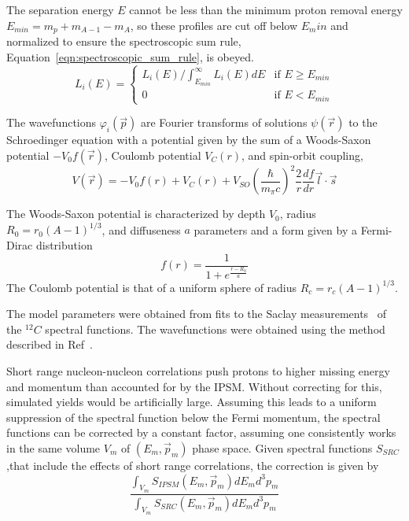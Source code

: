 The separation energy $E$ cannot be less than the minimum proton removal
energy $E_{min}=m_p + m_{A-1} - m_A$, so these profiles are cut off below
$E_min$ and normalized to ensure the spectroscopic sum rule,
Equation~\ref{eqn:spectroscopic_sum_rule}, is obeyed.
\begin{equation}
    L_i(E) =
    \begin{cases}
        L_i(E) / \int^{\infty}_{E_{min}} L_i(E) dE & \text{if $E \geq E_{min}$} \\
        0 & \text{if $E<E_{min}$}
    \end{cases}
\end{equation}


The wavefunctions $\varphi_i(\vec{p})$ are Fourier transforms of solutions
$\psi(\vec{r})$ to the Schroedinger equation with a potential given by the sum
of a
Woods-Saxon potential $-V_0 f(\vec{r})$,
Coulomb potential $V_C(r)$,
and spin-orbit coupling,
\begin{equation}
    V(\vec{r}) = - V_{0} f(r)
                 + V_{C}(r)
                 + V_{SO} \left(\frac{\hbar}{m_\pi c}\right)^{2}
                          \frac{2}{r} \frac{df}{dr}
                          \vec{l}\cdot\vec{s}
\end{equation}

The Woods-Saxon potential is characterized by
depth $V_0$,
radius $R_0=r_0(A-1)^{1/3}$, and
diffuseness $a$
parameters and a form given by a Fermi-Dirac distribution
\begin{equation}
    f(r) = \frac{1}{1+e^{\frac{r-R_0}{a}}}
\end{equation}
The Coulomb potential is that of a uniform sphere of radius
$R_c=r_c(A-1)^{1/3}$.


The model parameters were obtained from fits to the Saclay
measurements~\cite{Mougey_1976, Frullani_1984} of the ${}^{12}C$ spectral
functions.
The wavefunctions were obtained using the method described in
Ref~\cite{Giusti_1988, Giusti_1987, Blok_1991}.


Short range nucleon-nucleon correlations push protons to higher missing energy
and momentum than accounted for by the IPSM.
Without correcting for this, simulated yields would be artificially large.
Assuming this leads to a uniform suppression of the spectral function below the
Fermi momentum, the spectral functions can be corrected by a constant factor,
assuming one consistently works in the same volume $V_m$ of $(E_m,\vec{p}_m)$ phase
space.
Given spectral functions $S_{SRC}$,that include the effects of short range
correlations, the correction is given by
\begin{equation}
    \frac{\int_{V_m} S_{IPSM}(E_m,\vec{p}_m) dE_m d^3p_m}
         {\int_{V_m} S_{SRC} (E_m,\vec{p}_m) dE_m d^3p_m}
\end{equation}

